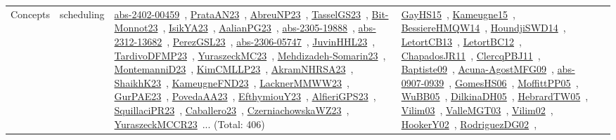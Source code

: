 {\begin{longtable}{lp{3cm}>{\raggedright\arraybackslash}p{6cm}>{\raggedright\arraybackslash}p{6cm}>{\raggedright\arraybackslash}p{8cm}}
Concepts & scheduling & \href{works/abs-2402-00459.pdf}{abs-2402-00459}~\cite{abs-2402-00459}, \href{works/PrataAN23.pdf}{PrataAN23}~\cite{PrataAN23}, \href{works/AbreuNP23.pdf}{AbreuNP23}~\cite{AbreuNP23}, \href{works/TasselGS23.pdf}{TasselGS23}~\cite{TasselGS23}, \href{works/Bit-Monnot23.pdf}{Bit-Monnot23}~\cite{Bit-Monnot23}, \href{works/IsikYA23.pdf}{IsikYA23}~\cite{IsikYA23}, \href{works/AalianPG23.pdf}{AalianPG23}~\cite{AalianPG23}, \href{works/abs-2305-19888.pdf}{abs-2305-19888}~\cite{abs-2305-19888}, \href{works/abs-2312-13682.pdf}{abs-2312-13682}~\cite{abs-2312-13682}, \href{works/PerezGSL23.pdf}{PerezGSL23}~\cite{PerezGSL23}, \href{works/abs-2306-05747.pdf}{abs-2306-05747}~\cite{abs-2306-05747}, \href{works/JuvinHHL23.pdf}{JuvinHHL23}~\cite{JuvinHHL23}, \href{works/TardivoDFMP23.pdf}{TardivoDFMP23}~\cite{TardivoDFMP23}, \href{works/YuraszeckMC23.pdf}{YuraszeckMC23}~\cite{YuraszeckMC23}, \href{works/Mehdizadeh-Somarin23.pdf}{Mehdizadeh-Somarin23}~\cite{Mehdizadeh-Somarin23}, \href{works/MontemanniD23.pdf}{MontemanniD23}~\cite{MontemanniD23}, \href{works/KimCMLLP23.pdf}{KimCMLLP23}~\cite{KimCMLLP23}, \href{works/AkramNHRSA23.pdf}{AkramNHRSA23}~\cite{AkramNHRSA23}, \href{works/ShaikhK23.pdf}{ShaikhK23}~\cite{ShaikhK23}, \href{works/KameugneFND23.pdf}{KameugneFND23}~\cite{KameugneFND23}, \href{works/LacknerMMWW23.pdf}{LacknerMMWW23}~\cite{LacknerMMWW23}, \href{works/GurPAE23.pdf}{GurPAE23}~\cite{GurPAE23}, \href{works/PovedaAA23.pdf}{PovedaAA23}~\cite{PovedaAA23}, \href{works/EfthymiouY23.pdf}{EfthymiouY23}~\cite{EfthymiouY23}, \href{works/AlfieriGPS23.pdf}{AlfieriGPS23}~\cite{AlfieriGPS23}, \href{works/SquillaciPR23.pdf}{SquillaciPR23}~\cite{SquillaciPR23}, \href{works/Caballero23.pdf}{Caballero23}~\cite{Caballero23}, \href{works/CzerniachowskaWZ23.pdf}{CzerniachowskaWZ23}~\cite{CzerniachowskaWZ23}, \href{works/YuraszeckMCCR23.pdf}{YuraszeckMCCR23}~\cite{YuraszeckMCCR23}... (Total: 406) & \href{works/GayHS15.pdf}{GayHS15}~\cite{GayHS15}, \href{works/Kameugne15.pdf}{Kameugne15}~\cite{Kameugne15}, \href{works/BessiereHMQW14.pdf}{BessiereHMQW14}~\cite{BessiereHMQW14}, \href{works/HoundjiSWD14.pdf}{HoundjiSWD14}~\cite{HoundjiSWD14}, \href{works/LetortCB13.pdf}{LetortCB13}~\cite{LetortCB13}, \href{works/LetortBC12.pdf}{LetortBC12}~\cite{LetortBC12}, \href{works/ChapadosJR11.pdf}{ChapadosJR11}~\cite{ChapadosJR11}, \href{works/ClercqPBJ11.pdf}{ClercqPBJ11}~\cite{ClercqPBJ11}, \href{works/Baptiste09.pdf}{Baptiste09}~\cite{Baptiste09}, \href{works/Acuna-AgostMFG09.pdf}{Acuna-AgostMFG09}~\cite{Acuna-AgostMFG09}, \href{works/abs-0907-0939.pdf}{abs-0907-0939}~\cite{abs-0907-0939}, \href{works/GomesHS06.pdf}{GomesHS06}~\cite{GomesHS06}, \href{works/MoffittPP05.pdf}{MoffittPP05}~\cite{MoffittPP05}, \href{works/WuBB05.pdf}{WuBB05}~\cite{WuBB05}, \href{works/DilkinaDH05.pdf}{DilkinaDH05}~\cite{DilkinaDH05}, \href{works/HebrardTW05.pdf}{HebrardTW05}~\cite{HebrardTW05}, \href{works/Vilim03.pdf}{Vilim03}~\cite{Vilim03}, \href{works/ValleMGT03.pdf}{ValleMGT03}~\cite{ValleMGT03}, \href{works/Vilim02.pdf}{Vilim02}~\cite{Vilim02}, \href{works/HookerY02.pdf}{HookerY02}~\cite{HookerY02}, \href{works/RodriguezDG02.pdf}{RodriguezDG02}~\cite{RodriguezDG02}, 
\end{longtable}}
